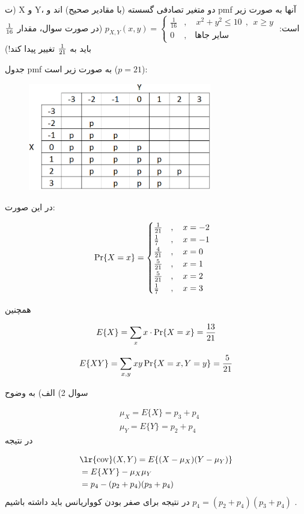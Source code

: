 \documentclass[10pt,letterpaper]{article}
\newcommand{\eqn}[1]{
\begin{equation}
\begin{split}
#1
\end{split}
\end{equation}
}
\begin{document}
ت) X و Y، دو متغیر تصادفی گسسته (با مقادیر صحیح) اند و pmf آنها به صورت زیر است:
$
p_{X,Y}(x,y)=\begin{cases}
\frac{1}{16}&,\quad x^2+y^2\le 10 \ \ ,\ \ x\ge y\\
0&,\quad \text{سایر جاها}
\end{cases}
$
(در صورت سوال، مقدار $1\over 16$ باید به $1\over 21$ تغییر پیدا کند!)

جدول pmf به صورت زیر است ($p=21$):
\begin{figure}[htbp]
\centering
\includegraphics[width=80mm]{hw11_pmf.png}
\end{figure}

در این صورت:
\eqn{
&\Pr\{X=x\}=\begin{cases}
{1\over 21}&,\quad x=-2\\
{1\over 7}&,\quad x=-1\\
{4\over 21}&,\quad x=0\\
{5\over 21}&,\quad x=1\\
{5\over 21}&,\quad x=2\\
{1\over 7}&,\quad x=3\\
\end{cases}
}

همچنین
\eqn{
E\{X\}=\sum_x x\cdot\Pr\{X=x\}={13\over 21}
}

\eqn{
E\{XY\}=\sum_{x,y} xy\Pr\{X=x,Y=y\}={5\over21}
}

سوال 2) الف) به وضوح 
\eqn{
&\mu_X=E\{X\}=p_3+p_4
\\&\mu_Y=E\{Y\}=p_2+p_4
}{}
در نتیجه
\eqn{
&\text{\lr{cov}}(X,Y)=E\{(X-\mu_X)(Y-\mu_Y)\}
\\&=E\{XY\}-\mu_X\mu_Y
\\&=p_4-(p_2+p_4)(p_3+p_4)
}{}
در نتیجه برای صفر بودن کوواریانس باید داشته باشیم 
$
p_4=(p_2+p_4)(p_3+p_4)
$
.
\end{document}
